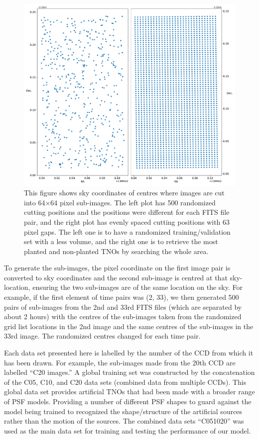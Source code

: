 \documentclass{aastex631}
\begin{document}
\begin{figure}[ht]
    \centering
    \includegraphics[width=\textwidth,keepaspectratio]{Figures/grid.pdf}
    \caption{This figure shows sky coordinates of centres where images are cut into 64$\times$64 pixel sub-images.
    The left plot has 500 randomized cutting positions and the positions were different for each FITS file pair, and the right plot has evenly spaced cutting positions with 63 pixel gaps.
    The left one is to have a randomized training/validation set with a less volume, and the right one is to retrieve the most planted and non-planted TNOs by searching the whole area.}
    \label{fig:grid}
\end{figure}

To generate the sub-images, the pixel coordinate on the first image pair is converted to sky coordinates and the second sub-image is centred at that sky-location, ensuring the two sub-images are of the same location on the sky.
For example, if the first element of time pairs was (2, 33), we then generated 500 pairs of sub-images from the 2nd and 33rd FITS files (which are separated by about 2 hours) with the centres of the sub-images taken from the randomized grid list locations in the 2nd image and the same centres of the sub-images in the 33rd image. The randomized centres changed for each time pair.

Each data set presented here is labelled by the number of the CCD from which it has been drawn.  For example, the sub-images made from the 20th CCD are labelled ``C20 images.'' 
A global training set was constructed by the concatenation of the C05, C10, and C20 data sets (combined data from multiple CCDs).  
This global data set provides artificial TNOs that had been made with a broader range of PSF models. 
Providing a number of different PSF shapes to guard against the model being trained to recognized the shape/structure of the artificial sources rather than the motion of the sources.
The combined data sets ``C051020'' was used as the main data set for training and testing the performance of our model.
\end{document}

